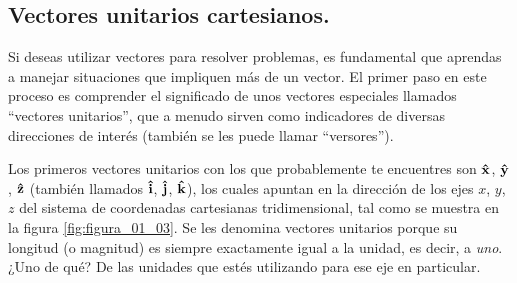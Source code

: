 \documentclass[hidelinks,12pt]{article}
\begin{document}
 \subsection{Vectores unitarios cartesianos.}

Si deseas utilizar vectores para resolver problemas, es fundamental que aprendas a manejar situaciones que impliquen más de un vector. El primer paso en este proceso es comprender el significado de unos vectores especiales llamados \enquote{vectores unitarios}, que a menudo sirven como indicadores de diversas direcciones de interés (también se les puede llamar \enquote{versores}).

Los primeros vectores unitarios con los que probablemente te encuentres son $\vu{x}$, $\vu{y}$, $\vu{z}$ (también llamados $\vu{i}$, $\vu{j}$, $\vu{k}$), los cuales apuntan en la dirección de los ejes $x$, $y$, $z$ del sistema de coordenadas cartesianas tridimensional, tal como se muestra en la figura \ref{fig:figura_01_03}. Se les denomina vectores unitarios porque su longitud (o magnitud) es siempre exactamente igual a la unidad, es decir, a \textit{uno}. ¿Uno de qué? De las unidades que estés utilizando para ese eje en particular.
\end{document}
